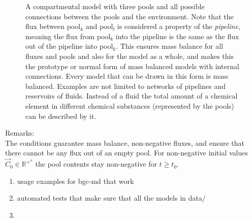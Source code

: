 \documentclass[a4paper]{article}
\DeclareRobustCommand{\Rbb}[1]{
		\mathbb{R}^{+^{#1}}
}
\DeclareRobustCommand{\Rbb}[1]{
		\mathbb{R}^{+^{#1}}
}
\begin{document}
\begin{appendices}
\begin{figure}[h]
	\caption{
     	\label{fig:3PoolsFeedBackWaterM}
	A compartmental model with three pools and all possible
	connections between the pools and the environment.  
	Note that the flux between pool$_k$ and pool$_l$ is considered a property of the
	\emph{pipeline}, meaning the flux from pool$_k$ into the pipeline is the
	same as the flux out of the pipeline into pool$_k$.  
	This ensures mass balance for all fluxes and pools and also for the model as a whole, and
	makes this the prototype or normal form of mass balanced models with
	internal connections.  
	Every model that can be drawn in this
	form is mass balanced.  Examples are not limited to networks of
	pipelines and reservoirs of fluids. Instead of a fluid the total amount
	of a chemical element in different chemical substances (represented by
	the pools) can be described by it.
	}
\end{figure}
Remarks:\\
The conditions guarantee mass balance, non-negative fluxes,
and ensure that there cannot be any flux out of an empty pool.
For non-negative initial values $\vec{C}_0\in \Rbb{n}$ the pool contents stay non-negative for  $t\ge t_0$.
\end{appendices}



%
\begin{enumerate}
		\item
			usage examples for bgc-md that work
		\item 
			automated tests that make sure that all the models in data/
		\item 
\end{enumerate}
\end{document}
